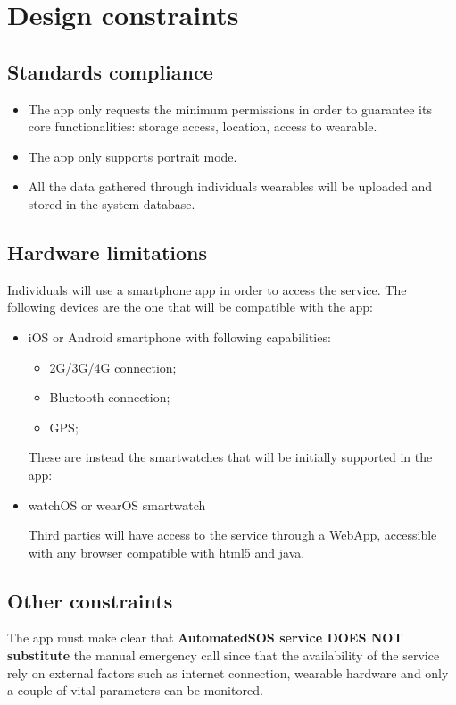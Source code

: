 \section{Design constraints}
\subsection{Standards compliance}
\begin{itemize}
\item The app only requests the minimum permissions in order to guarantee its core functionalities: storage access, location, access to wearable.
\item The app only supports portrait mode.
\item All the data gathered through individuals wearables will be uploaded and stored in the system database.
\end{itemize}


\subsection{Hardware limitations}
Individuals will use a smartphone app in order to access the service.
The following devices are the one that will be compatible with the app:
\begin{itemize}
\item iOS or Android smartphone with following capabilities:
\begin{itemize}
\item 2G/3G/4G connection;
\item Bluetooth connection;
\item GPS;
\end{itemize}
These are instead the smartwatches that will be initially supported in the app:
\item watchOS or wearOS smartwatch


Third parties will have access to the service through a WebApp, accessible with any browser compatible with html5 and java.
\end{itemize}

\subsection{Other constraints}
The app must make clear that \textbf{AutomatedSOS service DOES NOT substitute} the manual emergency call since that the availability of the service rely on external factors such as internet connection, wearable hardware and only a couple of vital parameters can be monitored.


